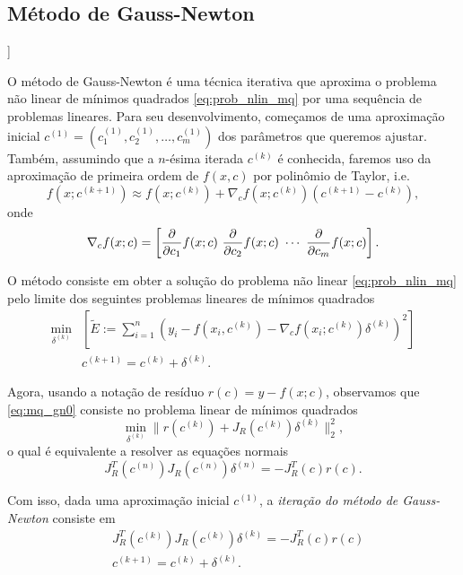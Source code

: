 \subsection{Método de Gauss-Newton}

\begin{flushleft}
  [[tag:revisar]]
\end{flushleft}

O método de Gauss-Newton é uma técnica iterativa que aproxima o problema não linear de mínimos quadrados \eqref{eq:prob_nlin_mq} por uma sequência de problemas lineares. Para seu desenvolvimento, começamos de uma aproximação inicial $c^{(1)} = (c_1^{(1)}, c_2^{(1)}, \dotsc, c_m^{(1)})$ dos parâmetros que queremos ajustar. Também, assumindo que a $n$-ésima iterada $c^{(k)}$ é conhecida, faremos uso da aproximação de primeira ordem de $f(x,c)$ por polinômio de Taylor, i.e.
\begin{equation}
  f(x;c^{(k+1)}) \approx f(x;c^{(k)}) + \nabla_c f(x;c^{(k)})(c^{(k+1)}-c^{(k)}),
\end{equation}
onde
\begin{equation}
  \nabla_c f(x;c) = \left[\frac{\partial}{\partial c_1}f(x;c) ~\frac{\partial}{\partial c_2}f(x;c) ~\cdots ~\frac{\partial}{\partial c_m}f(x;c)\right].
\end{equation}

O método consiste em obter a solução do problema não linear \eqref{eq:prob_nlin_mq} pelo limite dos seguintes problemas lineares de mínimos quadrados
\begin{align}
  \min_{\delta^{(k)}} &\left[\tilde{E} := \sum_{i=1}^n (y_i - f(x_i,c^{(k)}) - \nabla_c f(x_i;c^{(k)})\delta^{(k)})^2\right] \label{eq:mq_gn0}\\
  &c^{(k+1)} = c^{(k)} + \delta^{(k)}.
\end{align}

Agora, usando a notação de resíduo $r(c) = y - f(x;c)$, observamos que \eqref{eq:mq_gn0} consiste no problema linear de mínimos quadrados
\begin{equation}
  \min_{\delta^{(k)}} \|r(c^{(k)}) + J_R(c^{(k)})\delta^{(k)}\|_2^2,
\end{equation}
o qual é equivalente a resolver as equações normais
\begin{equation}
  J_R^T(c^{(n)})J_R(c^{(n)})\delta^{(n)} = -J_R^T(c)r(c).
\end{equation}

Com isso, dada uma aproximação inicial $c^{(1)}$, a \emph{iteração do método de Gauss-Newton} consiste em
\begin{align}
  &J_R^T(c^{(k)})J_R(c^{(k)})\delta^{(k)} = -J_R^T(c)r(c)\\
  &c^{(k+1)} = c^{(k)} + \delta^{(k)}.
\end{align}

